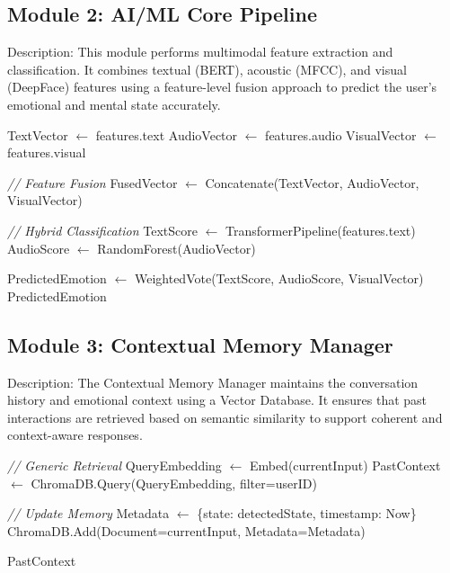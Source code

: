 \subsection{Module 2: AI/ML Core Pipeline}
Description:
This module performs multimodal feature extraction and classification. It combines textual (BERT), acoustic (MFCC), and visual (DeepFace) features using a feature-level fusion approach to predict the user's emotional and mental state accurately.

\begin{algorithm}[H]
\caption{AI/ML Core Pipeline Algorithm}
\begin{algorithmic}[1]
    \State TextVector $\gets$ features.text 
    \State AudioVector $\gets$ features.audio 
    \State VisualVector $\gets$ features.visual 
    
    \State \textit{// Feature Fusion}
    \State FusedVector $\gets$ Concatenate(TextVector, AudioVector, VisualVector)
    
    \State \textit{// Hybrid Classification}
    \State TextScore $\gets$ TransformerPipeline(features.text)
    \State AudioScore $\gets$ RandomForest(AudioVector)
    
    \State PredictedEmotion $\gets$ WeightedVote(TextScore, AudioScore, VisualVector)
    \State \Return PredictedEmotion
\EndProcedure
\end{algorithmic}
\end{algorithm}

\subsection{Module 3: Contextual Memory Manager}
Description:
The Contextual Memory Manager maintains the conversation history and emotional context using a Vector Database. It ensures that past interactions are retrieved based on semantic similarity to support coherent and context-aware responses.

\begin{algorithm}[H]
\caption{Contextual Memory Manager Algorithm}
\begin{algorithmic}[1]
    \State \textit{// Generic Retrieval}
    \State QueryEmbedding $\gets$ Embed(currentInput)
    \State PastContext $\gets$ ChromaDB.Query(QueryEmbedding, filter=userID)
    
    \State \textit{// Update Memory}
    \State Metadata $\gets$ \{state: detectedState, timestamp: Now\}
    \State ChromaDB.Add(Document=currentInput, Metadata=Metadata)
    
    \State \Return PastContext
\EndProcedure
\end{algorithmic}
\end{algorithm}

